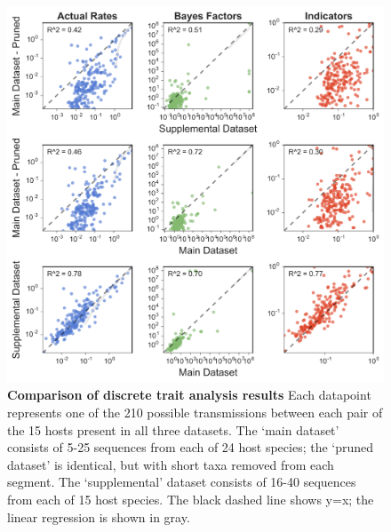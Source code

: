 \begin{figure}[ht!]
  \begin{centering}
    \includegraphics[width=\linewidth]{./png/siv_dataset_comparison.png}
  	\caption[Comparison of discrete trait analysis results]{\textbf{Comparison of discrete trait analysis results }
Each datapoint represents one of the 210 possible transmissions between each pair of the 15 hosts present in all three datasets.
The `main dataset' consists of 5-25 sequences from each of 24 host species; the `pruned dataset' is identical, but with short taxa removed from each segment.
The `supplemental' dataset consists of 16-40 sequences from each of 15 host species.
The black dashed line shows y=x; the linear regression is shown in gray.
        }
  	\label{siv_dataset_comparison}
  \end{centering}
\end{figure}

